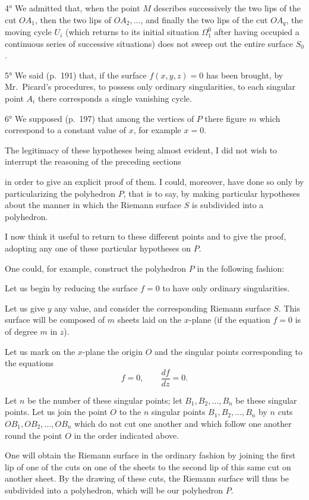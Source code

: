 \documentclass{article}
\begin{document}
4° We admitted that, when the point $M$ describes successively the two lips of the cut $OA_{1}$, then the two lips of $OA_{2}, \ldots$, and finally the two lips of the cut $OA_{q}$, the moving cycle $U_{i}$ (which returns to its initial situation $\Omega^{0}_{1}$ after having occupied a continuous series of successive situations) does not sweep out the entire surface $S_{0}$.

5° We said (p.\ 191) that, if the surface $f(x, y, z) = 0$ has been brought, by Mr.~Picard's procedures, to possess only ordinary singularities, to each singular point $A_{i}$ there corresponds a single vanishing cycle.

6° We supposed (p.\ 197) that among the vertices of $P$ there figure $m$ which correspond to a constant value of $x$, for example $x = 0$.

The legitimacy of these hypotheses being almost evident, I did not wish to interrupt the reasoning of the preceding sections

in order to give an explicit proof of them. I could, moreover, have done so only by particularizing the polyhedron $P$, that is to say, by making particular hypotheses about the manner in which the Riemann surface $S$ is subdivided into a polyhedron.

I now think it useful to return to these different points and to give the proof, adopting any one of these particular hypotheses on $P$.

One could, for example, construct the polyhedron $P$ in the following fashion:

Let us begin by reducing the surface $f = 0$ to have only ordinary singularities.

Let us give $y$ any value, and consider the corresponding Riemann surface $S$. This surface will be composed of $m$ sheets laid on the $x$-plane (if the equation $f = 0$ is of degree $m$ in $z$).

Let us mark on the $x$-plane the origin $O$ and the singular points corresponding to the equations
\[ f = 0, \qquad \frac{df}{dz} = 0. \]

Let $n$ be the number of these singular points; let $B_{1}, B_{2}, \ldots, B_{n}$ be these singular points. Let us join the point $O$ to the $n$ singular points $B_{1}, B_{2}, \ldots, B_{n}$ by $n$ cuts $OB_{1}, OB_{2}, \ldots, OB_{n}$ which do not cut one another and which follow one another round the point $O$ in the order indicated above.

One will obtain the Riemann surface in the ordinary fashion by joining the first lip of one of the cuts on one of the sheets to the second lip of this same cut on another sheet. By the drawing of these cuts, the Riemann surface will thus be subdivided into a polyhedron, which will be our polyhedron $P$.
\end{document}
